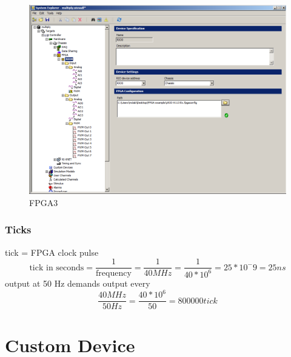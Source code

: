 \begin{figure}
	\includegraphics[scale=0.45]{fig/fpga3}
	\caption{FPGA3}
	\label{fig: fpga3}
\end{figure}
\subsubsection{Ticks}
tick = FPGA clock pulse
\[\text{tick in seconds}=\frac{1}{\text{frequency}}=\frac{1}{40MHz}=\frac{1}{40*10^{6}}=25*10^{-}9=25ns\]
output at 50 Hz demands output every 
\[\frac{40MHz}{50Hz}=\frac{40*10^{6}}{50}=800000tick\]
\section{Custom Device}
